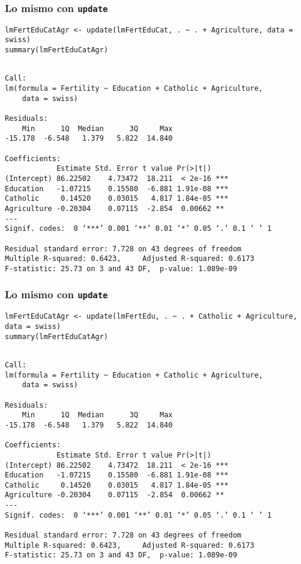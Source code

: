 \documentclass[bigger]{beamer}
\begin{document}
\begin{frame}[fragile]
\frametitle{Lo mismo con \texttt{update}}
\label{sec-3-6}


\lstset{language=R}
\begin{lstlisting}
lmFertEduCatAgr <- update(lmFertEduCat, . ~ . + Agriculture, data = swiss)
summary(lmFertEduCatAgr)
\end{lstlisting}


\begin{verbatim}

Call:
lm(formula = Fertility ~ Education + Catholic + Agriculture, 
    data = swiss)

Residuals:
    Min      1Q  Median      3Q     Max 
-15.178  -6.548   1.379   5.822  14.840 

Coefficients:
            Estimate Std. Error t value Pr(>|t|)    
(Intercept) 86.22502    4.73472  18.211  < 2e-16 ***
Education   -1.07215    0.15580  -6.881 1.91e-08 ***
Catholic     0.14520    0.03015   4.817 1.84e-05 ***
Agriculture -0.20304    0.07115  -2.854  0.00662 ** 
---
Signif. codes:  0 ‘***’ 0.001 ‘**’ 0.01 ‘*’ 0.05 ‘.’ 0.1 ‘ ’ 1 

Residual standard error: 7.728 on 43 degrees of freedom
Multiple R-squared: 0.6423,     Adjusted R-squared: 0.6173 
F-statistic: 25.73 on 3 and 43 DF,  p-value: 1.089e-09
\end{verbatim}
\end{frame}
\begin{frame}[fragile]
\frametitle{Lo mismo con \texttt{update}}
\label{sec-3-7}


\lstset{language=R}
\begin{lstlisting}
lmFertEduCatAgr <- update(lmFertEdu, . ~ . + Catholic + Agriculture, data = swiss)
summary(lmFertEduCatAgr)
\end{lstlisting}


\begin{verbatim}

Call:
lm(formula = Fertility ~ Education + Catholic + Agriculture, 
    data = swiss)

Residuals:
    Min      1Q  Median      3Q     Max 
-15.178  -6.548   1.379   5.822  14.840 

Coefficients:
            Estimate Std. Error t value Pr(>|t|)    
(Intercept) 86.22502    4.73472  18.211  < 2e-16 ***
Education   -1.07215    0.15580  -6.881 1.91e-08 ***
Catholic     0.14520    0.03015   4.817 1.84e-05 ***
Agriculture -0.20304    0.07115  -2.854  0.00662 ** 
---
Signif. codes:  0 ‘***’ 0.001 ‘**’ 0.01 ‘*’ 0.05 ‘.’ 0.1 ‘ ’ 1 

Residual standard error: 7.728 on 43 degrees of freedom
Multiple R-squared: 0.6423,     Adjusted R-squared: 0.6173 
F-statistic: 25.73 on 3 and 43 DF,  p-value: 1.089e-09
\end{verbatim}
\end{frame}
\end{document}
